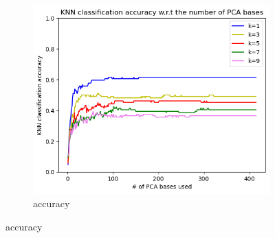 \begin{figure}
	\centering
	
	\begin{subfigure}[t]{0.48\linewidth}
		\centering
		\includegraphics[width=\linewidth]{image/q1_accuracy.png}
		\caption{accuracy}
		\label{fig:q1_knn_accuracy}
	\end{subfigure}
	
    \vspace{0.5cm} %


\end{figure}
